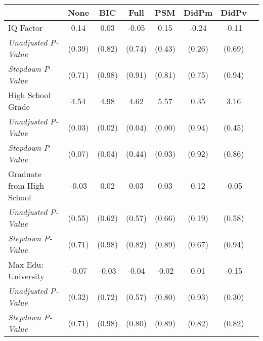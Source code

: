 \begin{tabular}{l c c c c c c c}
\toprule
 & None & BIC & Full & PSM & DidPm & DidPv \\
\midrule
IQ Factor & 0.14 & 0.03 & -0.05 & 0.15 & -0.24 & -0.11 \\
\quad \textit{Unadjusted P-Value} & (0.39) & (0.82) & (0.74) & (0.43) & (0.26) & (0.69) \\
\quad \textit{Stepdown P-Value} & (0.71) & (0.98) & (0.91) & (0.81) & (0.75) & (0.94) \\
High School Grade & 4.54 & 4.98 & 4.62 & 5.57 & 0.35 & 3.16 \\
\quad \textit{Unadjusted P-Value} & (0.03) & (0.02) & (0.04) & (0.00) & (0.94) & (0.45) \\
\quad \textit{Stepdown P-Value} & (0.07) & (0.04) & (0.44) & (0.03) & (0.92) & (0.86) \\
Graduate from High School & -0.03 & 0.02 & 0.03 & 0.03 & 0.12 & -0.05 \\
\quad \textit{Unadjusted P-Value} & (0.55) & (0.62) & (0.57) & (0.66) & (0.19) & (0.58) \\
\quad \textit{Stepdown P-Value} & (0.71) & (0.98) & (0.82) & (0.89) & (0.67) & (0.94) \\
Max Edu: University & -0.07 & -0.03 & -0.04 & -0.02 & 0.01 & -0.15 \\
\quad \textit{Unadjusted P-Value} & (0.32) & (0.72) & (0.57) & (0.80) & (0.93) & (0.30) \\
\quad \textit{Stepdown P-Value} & (0.71) & (0.98) & (0.80) & (0.89) & (0.82) & (0.82) \\
\bottomrule
\end{tabular}
